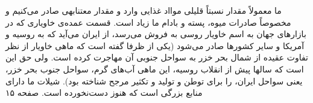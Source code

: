\par
ما معمولاً مقدار نسبتاً قلیلی موااد غذایی وارد و مقدار معتنابهی صادر می‌کنیم و مخصوصاً صادرات میوه، پسته و بادام ما زیاد است. قسمت عمده‌ی خاویاری که در بازارهای جهان به اسم خاویار روسی به فروش می‌رسد، از ایران  می‌آید که به روسیه و آمریکا و سایر کشورها صادر می‌شود (یکی از ظرفا گفته است که ماهی خاویار از نظر تفاوت عقیده از شمال بحر خزر به سواحل جنوبی آن مهاجرت کرده است. ولی حق این است که سالها پیش از انقلاب روسیه، این ماهی آب‌های گرم، سواحل جنوب بحر خزر، یعنی سواحل ایران، را برای توطن و تولید و تکثیر مرجح شناخته بود).
شیلات ما دارای منابع بزرگی است که هنوز دست‌نخورده است. 
صفحه ۱۵




 

